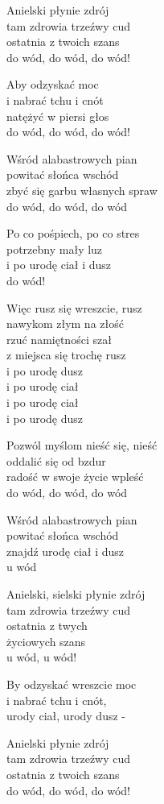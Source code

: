 \begin{text}
    \begin{footTwelve}
    Anielski płynie zdrój\\
    tam zdrowia trzeźwy cud\\
    ostatnia z twoich szans\\
    do wód, do wód, do wód!

    Aby odzyskać moc\\
    i nabrać tchu i cnót\\
    natężyć w piersi głos\\
    do wód, do wód, do wód!

    Wśród alabastrowych pian\\
    powitać słońca wschód\\
    zbyć się garbu własnych spraw\\
    do wód, do wód, do wód

    Po co pośpiech, po co stres\\
    potrzebny mały luz\\
    i po urodę ciał i dusz\\
    do wód!

    Więc rusz się wreszcie, rusz\\
    nawykom złym na złość\\
    rzuć namiętności szał\\
    z miejsca się trochę rusz\\
    i po urodę dusz\\
    i po urodę ciał\\
    i po urodę ciał\\
    i po urodę dusz

    Pozwól myślom nieść się, nieść\\
    oddalić się od bzdur\\
    radość w swoje życie wpleść\\
    do wód, do wód, do wód

    Wśród alabastrowych pian\\
    powitać słońca wschód\\
    znajdź urodę ciał i dusz\\
    u wód

    Anielski, sielski płynie zdrój\\
    tam zdrowia trzeźwy cud\\
    ostatnia z twych\\
    życiowych szans\\
    u wód, u wód!

    By odzyskać wreszcie moc\\
    i nabrać tchu i cnót,\\
    urody ciał, urody dusz -

    Anielski płynie zdrój\\
    tam zdrowia trzeźwy cud\\
    ostatnia z twoich szans\\
    do wód, do wód, do wód!
\end{footTwelve}
\end{text}
\begin{chord}

\end{chord}